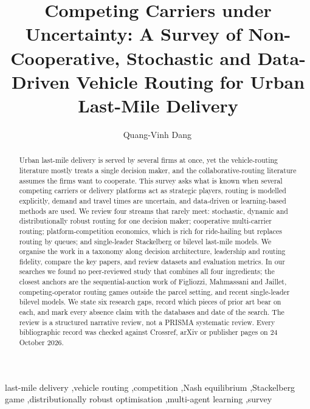 \documentclass[preprint,12pt]{elsarticle}
\begin{document}
\begin{frontmatter}

\title{Competing Carriers under Uncertainty: A Survey of Non-Cooperative, Stochastic and Data-Driven Vehicle Routing for Urban Last-Mile Delivery}

\author{Quang-Vinh Dang\,}
\address{British University Vietnam, Hung Yen, Vietnam}

\begin{abstract}
Urban last-mile delivery is served by several firms at once, yet the vehicle-routing literature mostly treats a single decision maker, and the collaborative-routing literature assumes the firms want to cooperate. This survey asks what is known when several competing carriers or delivery platforms act as strategic players, routing is modelled explicitly, demand and travel times are uncertain, and data-driven or learning-based methods are used. We review four streams that rarely meet: stochastic, dynamic and distributionally robust routing for one decision maker; cooperative multi-carrier routing; platform-competition economics, which is rich for ride-hailing but replaces routing by queues; and single-leader Stackelberg or bilevel last-mile models. We organise the work in a taxonomy along decision architecture, leadership and routing fidelity, compare the key papers, and review datasets and evaluation metrics. In our searches we found no peer-reviewed study that combines all four ingredients; the closest anchors are the sequential-auction work of Figliozzi, Mahmassani and Jaillet, competing-operator routing games outside the parcel setting, and recent single-leader bilevel models. We state six research gaps, record which pieces of prior art bear on each, and mark every absence claim with the databases and date of the search. The review is a structured narrative review, not a PRISMA systematic review. Every bibliographic record was checked against Crossref, arXiv or publisher pages on 24 October 2026.
\end{abstract}

\begin{keyword}
last-mile delivery \sep vehicle routing \sep competition \sep Nash equilibrium \sep Stackelberg game \sep distributionally robust optimisation \sep multi-agent learning \sep survey
\end{keyword}

\end{frontmatter}

\end{document}
